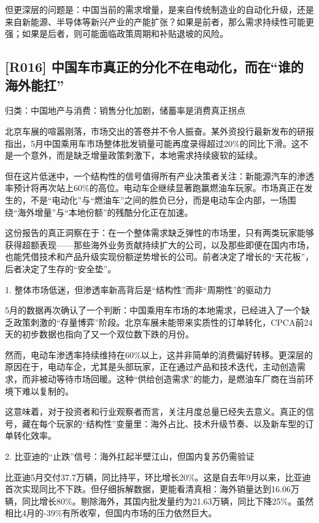 \documentclass[11pt]{ctexart}
\begin{document}
但更深层的问题是：中国当前的需求增量，是来自传统制造业的自动化升级，还是来自新能源、半导体等新兴产业的产能扩张？如果是前者，那么需求持续性可能更强；如果是后者，则可能面临政策周期和补贴退坡的风险。

\subsection{[R016] 中国车市真正的分化不在电动化，而在“谁的海外能扛”}
{\small\color{refgray}归类：中国地产与消费：销售分化加剧，储蓄率是消费真正拐点}

北京车展的喧嚣刚落，市场交出的答卷并不令人振奋。某外资投行最新发布的研报指出，5月中国乘用车市场整体批发销量可能再度录得超过20\%的同比下滑。这不是一个意外，而是缺乏增量政策刺激下，本地需求持续疲软的延续。

但在这片低迷中，一个结构性的信号值得所有产业决策者关注：新能源汽车的渗透率预计将再次站上60\%的高位。电动车企继续显著跑赢燃油车玩家。市场真正在发生的，不是“电动化”与“燃油车”之间的胜负已分，而是电动车企内部，一场围绕“海外增量”与“本地份额”的残酷分化正在加速。

这份报告的真正洞察在于：在一个整体需求缺乏弹性的市场里，只有两类玩家能够获得超额表现——那些海外业务贡献持续扩大的公司，以及那些即便在国内市场，也能凭借技术和产品升级实现份额逆势增长的公司。前者决定了增长的“天花板”，后者决定了生存的“安全垫”。

1. 整体市场低迷，但渗透率新高背后是“结构性”而非“周期性”的驱动力

5月的数据再次确认了一个判断：中国乘用车市场的本地需求，已经进入了一个缺乏政策刺激的“存量博弈”阶段。北京车展未能带来实质性的订单转化，CPCA前24天的初步数据也指向了又一个双位数下跌的月份。

然而，电动车渗透率持续维持在60\%以上，这并非简单的消费偏好转移。更深层的原因在于，电动车企，尤其是头部玩家，正在通过产品和技术迭代，主动创造需求，而非被动等待市场回暖。这种“供给创造需求”的能力，是燃油车厂商在当前环境下难以复制的。

这意味着，对于投资者和行业观察者而言，关注月度总量已经失去意义。真正的信号，藏在每个玩家的“结构性”变量里：海外占比、技术升级节奏、以及新车型的订单转化效率。

2. 比亚迪的“止跌”信号：海外扛起半壁江山，但国内复苏仍需验证

比亚迪5月交付37.7万辆，同比持平，环比增长20\%。这是自去年9月以来，比亚迪首次实现同比不下跌。但仔细拆解数据，更能看清真相：海外销量达到16.06万辆，同比增长80\%。剔除海外，其国内批发量约为21.63万辆，同比下降25\%。虽然相比4月的-39\%有所收窄，但国内市场的压力依然巨大。
\end{document}
